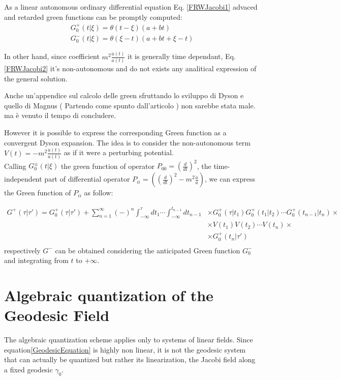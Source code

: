 \documentclass[Main]{subfiles}
\begin{document}
			As a linear autonomous ordinary differential equation Eq. \ref{FRWJacobi1} advaced and retarded green functions can be promptly computed:
			\begin{eqnarray*}
				G^+_0(t \vert \xi) = \theta(t-\xi) \left(a +b t \right) \\
				G^-_0( t \vert \xi) = \theta(\xi -t) \left( a +b t + \xi -t\right)
			\end{eqnarray*}

			In other hand, since coefficient $m^2 \frac{\ddot{a}(t)}{a(t)}$ it is generally time dependant,  Eq. \ref{FRWJacobi2} it's non-autonomous and do not exists any analitical expression of the general solution.
\ifToninus
	\begin{Warning}	
		Anche un'appendice sul calcolo delle green sfruttando lo sviluppo di Dyson e quello di Magnus ( Partendo come spunto dall'articolo \cite{Dappiaggi2014}) non sarebbe stata male. ma è venuto il tempo di concludere.
	\end{Warning}
\fi	
			However it is possible to express the corresponding Green function as a convergent Dyson expansion\cite{Dappiaggi2014}.
			The idea is to consider the non-autonomous term $V(t) = -m^2 \frac{\ddot{a}(t)}{a(t)}$ as if it were a perturbing potential.\\
			Calling $G^\pm_0 (t \vert \xi)$ the green function of operator $P_{0 0}=\left(\frac{d}{dt}\right)^2$, the time-independent part of differential operator $P_{i i}=\left( \left(\frac{d}{dt}\right)^2 - m^2 \frac{\ddot{a}}{a} \right)$, we can express the Green function of $P_{i i}$ as follow:
			
			\begin{align*}
				G^+ ( \tau \vert \tau' ) = G^+_0( \tau \vert \tau' ) + \sum_{n=1}^\infty (-)^n 
				\int_{-\infty}^\tau dt_1 \cdots \int_{-\infty}^{t_{n-1}} dt_{n-1} 
				& \times	  G^+_0(\tau \vert t_1) G^+_0(t_1\vert t_2) \cdots G^+_0(t_{n-1} \vert t_n) \times \\
				& \times  V(t_1) V(t_2) \cdots V(t_n) \times \\
				& \times  G^+_0 (t_n \vert \tau' ) \\
			\end{align*}		
			respectively $G^-$  can be obtained considering the anticipated Green function $G^-_0$ and integrating from $t$ to $+\infty$.
			
			
		
		
		 		
		\cite{Wald1984}
		

\section{Algebraic quantization of the Geodesic Field}
	The algebraic quantization scheme applies only to %
	systems of linear fields.
	Since equation\ref{GeodesicEquation} is highly non linear,  it is not the geodesic system that can actually be quantized but rather its linearization, the Jacobi field along a fixed geodesic $\gamma_0$.
	
\end{document}
